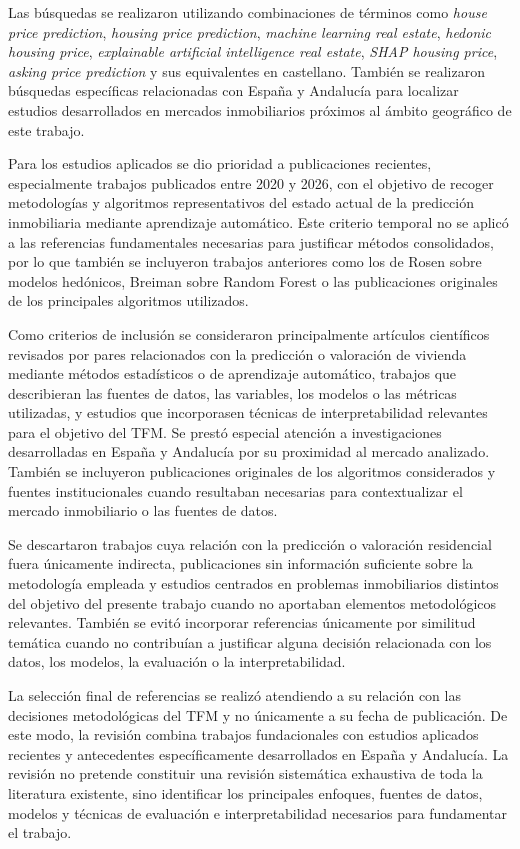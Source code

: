 \documentclass[IB]{TFUOC}%
\begin{document}
Las búsquedas se realizaron utilizando combinaciones de términos como \textit{house price prediction}, \textit{housing price prediction}, \textit{machine learning real estate}, \textit{hedonic housing price}, \textit{explainable artificial intelligence real estate}, \textit{SHAP housing price}, \textit{asking price prediction} y sus equivalentes en castellano. También se realizaron búsquedas específicas relacionadas con España y Andalucía para localizar estudios desarrollados en mercados inmobiliarios próximos al ámbito geográfico de este trabajo.

Para los estudios aplicados se dio prioridad a publicaciones recientes, especialmente trabajos publicados entre 2020 y 2026, con el objetivo de recoger metodologías y algoritmos representativos del estado actual de la predicción inmobiliaria mediante aprendizaje automático. Este criterio temporal no se aplicó a las referencias fundamentales necesarias para justificar métodos consolidados, por lo que también se incluyeron trabajos anteriores como los de Rosen sobre modelos hedónicos, Breiman sobre Random Forest o las publicaciones originales de los principales algoritmos utilizados.

Como criterios de inclusión se consideraron principalmente artículos científicos revisados por pares relacionados con la predicción o valoración de vivienda mediante métodos estadísticos o de aprendizaje automático, trabajos que describieran las fuentes de datos, las variables, los modelos o las métricas utilizadas, y estudios que incorporasen técnicas de interpretabilidad relevantes para el objetivo del TFM. Se prestó especial atención a investigaciones desarrolladas en España y Andalucía por su proximidad al mercado analizado. También se incluyeron publicaciones originales de los algoritmos considerados y fuentes institucionales cuando resultaban necesarias para contextualizar el mercado inmobiliario o las fuentes de datos.

Se descartaron trabajos cuya relación con la predicción o valoración residencial fuera únicamente indirecta, publicaciones sin información suficiente sobre la metodología empleada y estudios centrados en problemas inmobiliarios distintos del objetivo del presente trabajo cuando no aportaban elementos metodológicos relevantes. También se evitó incorporar referencias únicamente por similitud temática cuando no contribuían a justificar alguna decisión relacionada con los datos, los modelos, la evaluación o la interpretabilidad.

La selección final de referencias se realizó atendiendo a su relación con las decisiones metodológicas del TFM y no únicamente a su fecha de publicación. De este modo, la revisión combina trabajos fundacionales con estudios aplicados recientes y antecedentes específicamente desarrollados en España y Andalucía. La revisión no pretende constituir una revisión sistemática exhaustiva de toda la literatura existente, sino identificar los principales enfoques, fuentes de datos, modelos y técnicas de evaluación e interpretabilidad necesarios para fundamentar el trabajo.
\end{document}
